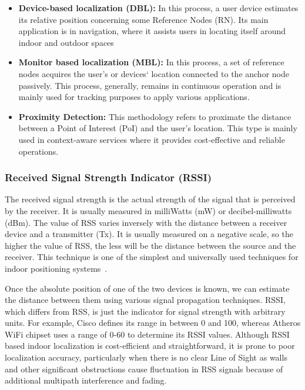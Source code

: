 \documentclass[a4paper,singleside,12pt]{report} %
\begin{document}
					\begin{itemize}
				
					\item  \textbf{Device-based localization (DBL):}  In this process, a user device estimates its relative position concerning some Reference Nodes (RN). Its main application is in navigation, where it assists users in locating itself around indoor and outdoor spaces
					\item  \textbf{Monitor based localization (MBL):} In this process, a set of reference nodes acquires the user's or devices` location connected to the anchor node passively. This process, generally, remains in continuous operation and is mainly used for tracking purposes to apply various applications.
					\item  \textbf{Proximity Detection:} This methodology refers to proximate the distance between a Point of Interest (PoI) and the user's location. This type is mainly used in context-aware services where it provides cost-effective and reliable operations. 
				
					\end{itemize}

				\subsubsection{Received Signal Strength Indicator (RSSI)}
					The received signal strength is the actual strength of the signal that is perceived by the receiver. 
					It is usually measured in milliWatts (mW) or decibel-milliwatts (dBm).  
					The value of RSS varies inversely with the distance between a receiver device and a transmitter (Tx).  
					It is usually measured on a negative scale, so the higher the value of RSS, the less will be the distance between the source and the receiver. 
					This technique is one of the simplest and universally used techniques for indoor positioning systems~\cite{ladd2005robotics, krishnan2004system, haeberlen2004practical, castro2001probabilistic, yang2013rssi}.
					
					Once the absolute position of one of the two devices is known, we can estimate the distance between them using various signal propagation techniques. 
					RSSI, which differs from RSS, is just the indicator for signal strength with arbitrary units. 
					For example, Cisco defines its range in between 0 and 100, whereas Atheros WiFi chipset uses a range of 0-60 to determine its RSSI values. 
					Although RSSI based indoor localization is cost-efficient and straightforward, it is prone to poor localization accuracy, particularly when there is no clear Line of Sight as walls and other significant obstructions cause fluctuation in RSS signals because of additional multipath interference and fading.~\cite{xiao2013pilot,yang2013rssi}
					
\end{document}
